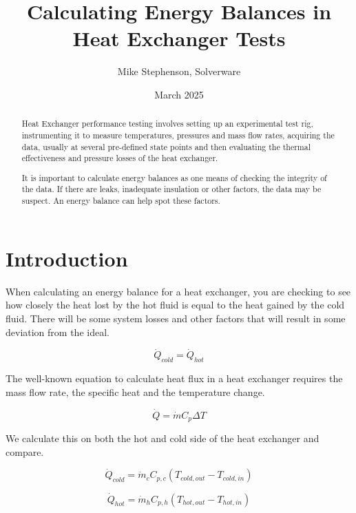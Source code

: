 \documentclass[letterpaper,twocolumn]{article}  %
\title{Calculating Energy Balances in Heat Exchanger Tests}
\author{Mike Stephenson, Solverware}
\date{March 2025}                  %
\begin{document}
	
	\maketitle                         %
	
	\begin{abstract}                   %
		Heat Exchanger performance testing involves setting up an experimental test rig, instrumenting it to measure temperatures, pressures and mass flow rates, acquiring the data, usually at several pre-defined state points and then evaluating the thermal effectiveness and pressure losses of the heat exchanger.
		
		It is important to calculate energy balances as one means of checking the integrity of the data. If there are leaks, inadequate insulation or other factors, the data may be suspect. An energy balance can help spot these factors.
	\end{abstract}
	
	\section{Introduction}
	When calculating an energy balance for a heat exchanger, you are checking to see how closely the heat lost by the hot fluid is equal to the heat gained by the cold fluid. There will be some system losses and other factors that will result in some deviation from the ideal. 
	
	\begin{equation}
		\dot{Q}_{cold} = \dot{Q}_{hot}
		\label{eq:darcy_equation}
	\end{equation}
	
	The well-known equation to calculate heat flux in a heat exchanger requires the mass flow rate, the specific heat and the temperature change. 
	
	\begin{equation}
		\dot{Q}=\dot{m}  C_p  \Delta T
	\end{equation}
	
	We calculate this on both the hot and cold side of the heat exchanger and compare.
	
	\begin{equation}
		\dot{Q}_{cold}=\dot{m}_{c}  C_{p,c} (T_{cold,out}-T_{cold,in})  
	\end{equation}
	
	\begin{equation}
		\dot{Q}_{hot}=\dot{m}_{h}  C_{p,h} (T_{hot,out}-T_{hot,in})  
	\end{equation}
	
\end{document}
